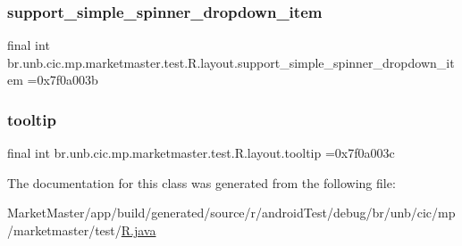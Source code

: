 \subsubsection{\texorpdfstring{support\+\_\+simple\+\_\+spinner\+\_\+dropdown\+\_\+item}{support\_simple\_spinner\_dropdown\_item}}
{\footnotesize\ttfamily final int br.\+unb.\+cic.\+mp.\+marketmaster.\+test.\+R.\+layout.\+support\+\_\+simple\+\_\+spinner\+\_\+dropdown\+\_\+item =0x7f0a003b\hspace{0.3cm}{\ttfamily [static]}}

\mbox{\label{classbr_1_1unb_1_1cic_1_1mp_1_1marketmaster_1_1test_1_1R_1_1layout_af40ecd2163f770fd0050c99ff08abe17}} 
\subsubsection{\texorpdfstring{tooltip}{tooltip}}
{\footnotesize\ttfamily final int br.\+unb.\+cic.\+mp.\+marketmaster.\+test.\+R.\+layout.\+tooltip =0x7f0a003c\hspace{0.3cm}{\ttfamily [static]}}



The documentation for this class was generated from the following file\+:\begin{DoxyCompactItemize}
\item 
Market\+Master/app/build/generated/source/r/android\+Test/debug/br/unb/cic/mp/marketmaster/test/\mbox{\hyperlink{androidTest_2debug_2br_2unb_2cic_2mp_2marketmaster_2test_2R_8java}{R.\+java}}\end{DoxyCompactItemize}
